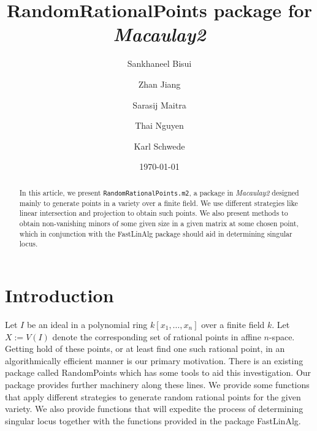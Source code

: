 \documentclass[11pt]{amsart}
\theoremstyle{definition}
\begin{document}
\title{{RandomRationalPoints} package for \emph{Macaulay2}}
\author{Sankhaneel Bisui}
\address{Tulane University}
\author{Zhan Jiang}
\address{University of Michigan}
\author{Sarasij Maitra}
\address{University of Virginia}
\author{Thai Nguyen}
\address{Tulane University}
\author{Karl Schwede}
\address{Department of Mathematics, University of Utah, 155 S 1400 E Room 233, Salt Lake City, UT, 84112}
\date{\today}

\begin{abstract}
In this article, we present {\tt RandomRationalPoints.m2}, a package in \emph{Macaulay2} designed mainly to generate points in a variety over a finite field. We use different strategies like linear intersection and projection to obtain such points. We also present methods to obtain non-vanishing minors of some given size in a given matrix at some chosen point, which in conjunction with the FastLinAlg package should aid in determining singular locus.
\end{abstract}

 

\maketitle

\section{Introduction}
 Let $I$ be an ideal in a polynomial ring $k[x_1,\dots, x_n]$ over a finite field $k$. Let $X:=V(I)$ denote the corresponding set of rational points in affine $n$-space. Getting hold of these points, or at least find one such rational point, in an algorithmically efficient manner is our primary motivation. There is an existing package called RandomPoints which has some tools to aid this investigation. Our package provides further machinery along these lines. We provide some functions that apply different strategies to generate random rational points for the given variety. We also provide functions that will expedite the process of determining singular locus together with the functions provided in the package FastLinAlg.  
 
\end{document}
